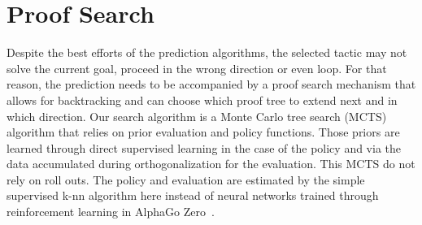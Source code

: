 \documentclass[runningheads,a4paper,draft]{svjour3}
\begin{document}
  
%
%
%
%
%
%
%
%
%


\section{Proof Search}\label{sec:proofsearch}

Despite the best efforts of the prediction algorithms, the selected tactic may 
not solve the current goal, proceed in the wrong direction
or even loop. For that reason, the prediction needs to be accompanied by a  
proof search mechanism that allows for backtracking and 
can choose which proof tree to extend next and in which direction.
Our search algorithm is a Monte Carlo tree search (MCTS) algorithm that relies 
on prior evaluation and policy functions. Those priors are learned through 
direct supervised learning in the case of the policy and via the data 
accumulated during orthogonalization for the evaluation. This MCTS do not rely 
on roll outs. The 
policy and evaluation are estimated by the simple supervised k-nn algorithm 
here instead of neural networks trained through reinforcement learning in 
AlphaGo Zero~\cite{}. 
\end{document}
